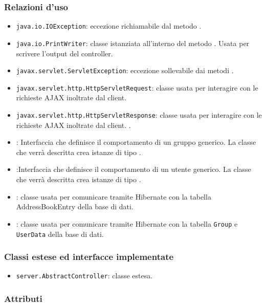 \subsubsection*{Relazioni d'uso}

\begin{itemize}
	\item \texttt{java.io.IOException}: eccezione richiamabile dal metodo .
	\item \texttt{java.io.PrintWriter}: classe istanziata all'interno del metodo . Usata per scrivere l'output del controller.
	\item \texttt{javax.servlet.ServletException}: eccezione sollevabile dai metodi .
	\item \texttt{javax.servlet.http.HttpServletRequest}: classe usata per interagire con le richieste AJAX inoltrate dal client.
	\item \texttt{javax.servlet.http.HttpServletResponse}: classe usata per interagire con le richieste AJAX inoltrate dal client. .
	\item {}:
Interfaccia che definisce il comportamento di un gruppo generico. La classe che verrà descritta crea istanze di tipo .
	\item {}:Interfaccia che definisce il comportamento di un utente generico. La classe che verrà descritta crea istanze di tipo .
	\item {}: classe usata per comunicare tramite Hibernate con la tabella AddressBookEntry della base di dati.
	\item {}: classe usata per comunicare tramite Hibernate con la tabella \texttt{Group} e \texttt{UserData} della base di dati.
\end{itemize}

\subsubsection*{Classi estese ed interfacce implementate}
\begin{itemize}
	\item \texttt{server.AbstractController}: classe estesa.
\end{itemize}

\subsubsection*{Attributi}


